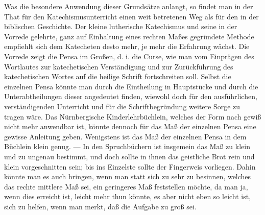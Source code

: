 Was die besondere Anwendung dieser Grundsätze anlangt, so findet man in der That für den Katechismusunterricht einen weit betretenen Weg als für den in der biblischen Geschichte. Der kleine lutherische Katechismus und seine in der Vorrede gelehrte, ganz auf Einhaltung eines rechten Maßes gegründete Methode empfiehlt sich dem Katecheten desto mehr, je mehr die Erfahrung wächst. Die Vorrede zeigt die Pensa im Großen, d. i. die Curse, wie man vom Einprägen des Wortlautes zur katechetischen Verständigung und zur Zurückführung des katechetischen Wortes auf die heilige Schrift fortschreiten soll. Selbst die einzelnen Pensa könnte man durch die Eintheilung in Hauptstücke und durch die Unterabtheilungen dieser angedeutet finden, wiewohl doch für den ausführlichen, verständigenden Unterricht und für die Schriftbegründung weitere Sorge zu tragen wäre. Das Nürnbergische Kinderlehrbüchlein, welches der Form nach gewiß nicht mehr anwendbar ist, könnte dennoch für das Maß der einzelnen Pensa eine gewisse Anleitung geben. Wenigstens ist das Maß der einzelnen Pensa in dem Büchlein klein genug. — In den Spruchbüchern ist insgemein das Maß zu klein und zu ungenau bestimmt, und doch sollte in ihnen das geistliche Brot rein und klein vorgeschnitten sein; bis ins Einzelste sollte der Fingerweis vorliegen. Dahin könnte man es auch bringen, wenn man statt sich zu sehr zu besinnen, welches das rechte mittlere Maß sei, ein geringeres Maß feststellen möchte, da man ja, wenn dies erreicht ist, leicht mehr thun könnte, es aber nicht eben so leicht ist, sich zu helfen, wenn man merkt, daß die Aufgabe zu groß sei.

